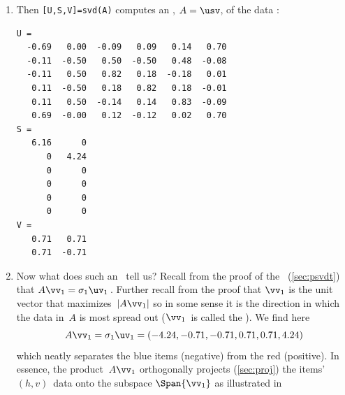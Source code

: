 \begin{example}
\begin{solution}
\begin{enumerate}
\item Then \verb|[U,S,V]=svd(A)| computes an \svd, \(A=\usv\), of the data \twodp:
\begin{verbatim}
U =
  -0.69   0.00  -0.09   0.09   0.14   0.70
  -0.11  -0.50   0.50  -0.50   0.48  -0.08
  -0.11   0.50   0.82   0.18  -0.18   0.01
   0.11  -0.50   0.18   0.82   0.18  -0.01
   0.11   0.50  -0.14   0.14   0.83  -0.09
   0.69  -0.00   0.12  -0.12   0.02   0.70
S =
   6.16      0
      0   4.24
      0      0
      0      0
      0      0
      0      0
V =
   0.71   0.71
   0.71  -0.71
\end{verbatim}

\item Now what does such an \svd\ tell us?
Recall from the proof of the \svd\ (\cref{sec:psvdt}) that \(A\vv_1=\sigma_1\uv_1\)\,. 
Further recall from the proof that \(\vv_1\) is the unit vector that maximizes~\(|A\vv_1|\) so in some sense it is the direction in which the data in~\(A\) is most spread out (\(\vv_1\)~is called the ).
We find here \twodp
{}%
\begin{equation*}
A\vv_1=\sigma_1\uv_1=(-4.24,-0.71,-0.71,0.71,0.71,4.24)
\end{equation*}
which neatly separates the blue items (negative) from the red (positive).
In essence, the product~\(A\vv_1\) orthogonally projects (\cref{sec:proj}) the items' \((h,v)\)~data onto the subspace \(\Span\{\vv_1\}\) as illustrated in 
\end{enumerate}
\end{solution}
\end{example}

